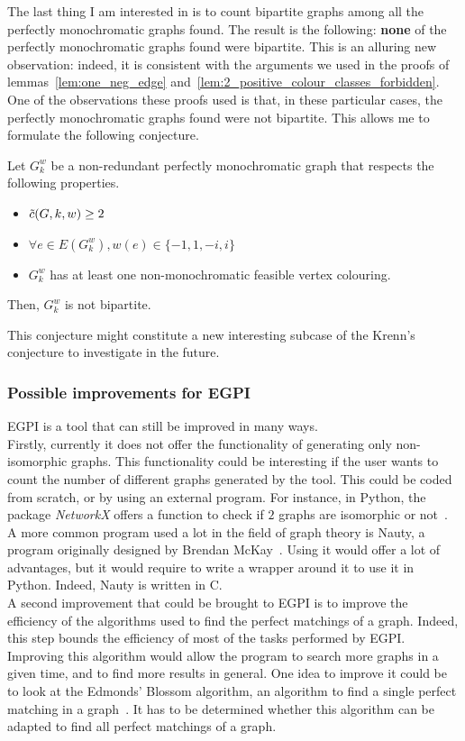 The last thing I am interested in is to count bipartite graphs among all the perfectly monochromatic graphs found.
The result is the following: \textbf{none} of the perfectly monochromatic graphs found were bipartite.
This is an alluring new observation: indeed, it is consistent with the arguments we used in the proofs of lemmas~\ref{lem:one_neg_edge} and~\ref{lem:2_positive_colour_classes_forbidden}.
One of the observations these proofs used is that, in these particular cases, the perfectly monochromatic graphs found were not bipartite.
This allows me to formulate the following conjecture.

\begin{conjecture}
    \label{con:bipartite_perfectly_monochromatic}
    Let $G_k^w$ be a non-redundant perfectly monochromatic graph that respects the following properties.
    \begin{itemize}
        \item $\Tilde{c}(G, k, w) \geq 2$
        \item $\forall e \in E(G_k^w), w(e) \in \{-1, 1, -i, i\}$
        \item $G_k^w$ has at least one non-monochromatic feasible vertex colouring.
    \end{itemize}
    Then, $G_k^w$ is not bipartite.
\end{conjecture}

This conjecture might constitute a new interesting subcase of the Krenn's conjecture to investigate in the future.


\subsubsection{Possible improvements for EGPI}

EGPI is a tool that can still be improved in many ways.\\

Firstly, currently it does not offer the functionality of generating only non-isomorphic graphs.
This functionality could be interesting if the user wants to count the number of different graphs generated by the tool.
This could be coded from scratch, or by using an external program.
For instance, in Python, the package \textit{NetworkX} offers a function to check if $2$ graphs are isomorphic or not~\cite{networkx}.
A more common program used a lot in the field of graph theory is Nauty, a program originally designed by Brendan McKay~\cite{MCKAY201494}.
Using it would offer a lot of advantages, but it would require to write a wrapper around it to use it in Python.
Indeed, Nauty is written in C. \\

A second improvement that could be brought to EGPI is to improve the efficiency of the algorithms used to find the perfect matchings of a graph.
Indeed, this step bounds the efficiency of most of the tasks performed by EGPI\@.
Improving this algorithm would allow the program to search more graphs in a given time, and to find more results in general.
One idea to improve it could be to look at the Edmonds' Blossom algorithm, an algorithm to find a single perfect matching in a graph~\cite{Edmonds_1965}.
It has to be determined whether this algorithm can be adapted to find all perfect matchings of a graph.\\
